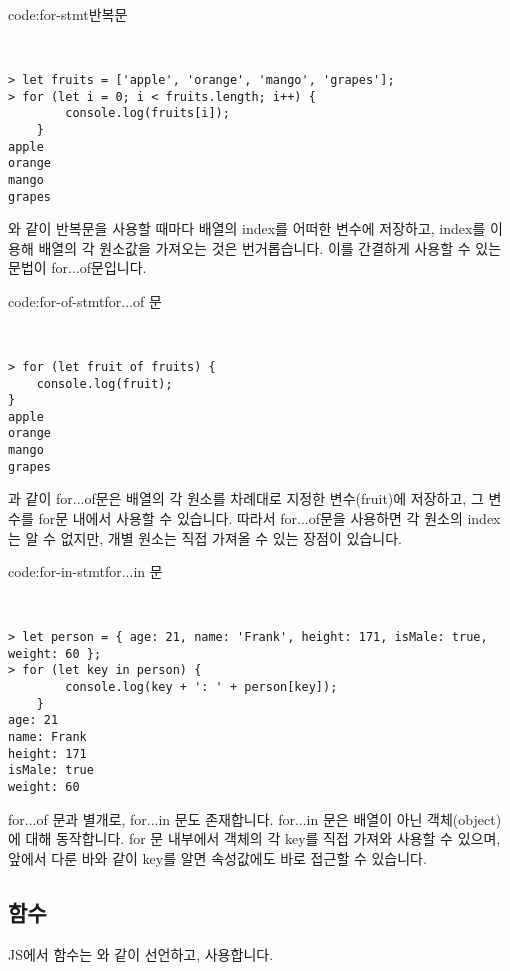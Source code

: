 \begin{codeenv}{code:for-stmt}{반복문}\begin{verbatim}


> let fruits = ['apple', 'orange', 'mango', 'grapes'];
> for (let i = 0; i < fruits.length; i++) {
        console.log(fruits[i]);
    }
apple
orange
mango
grapes
\end{verbatim}
\end{codeenv}

와 같이 반복문을 사용할 때마다 배열의 index를 어떠한 변수에 저장하고, index를 이용해 배열의 각 원소값을 가져오는 것은 번거롭습니다. 이를 간결하게 사용할 수 있는 문법이 for...of문입니다.

\begin{codeenv}{code:for-of-stmt}{for...of 문}\begin{verbatim}


> for (let fruit of fruits) {
    console.log(fruit);
}
apple
orange
mango
grapes
\end{verbatim}
\end{codeenv}

과 같이 for...of문은 배열의 각 원소를 차례대로 지정한 변수(fruit)에 저장하고, 그 변수를 for문 내에서 사용할 수 있습니다. 따라서 for...of문을 사용하면 각 원소의 index는 알 수 없지만, 개별 원소는 직접 가져올 수 있는 장점이 있습니다.

\begin{codeenv}{code:for-in-stmt}{for...in 문}\begin{verbatim}


> let person = { age: 21, name: 'Frank', height: 171, isMale: true, weight: 60 };
> for (let key in person) {
        console.log(key + ': ' + person[key]);
    }
age: 21
name: Frank
height: 171
isMale: true
weight: 60
\end{verbatim}
\end{codeenv}

for...of 문과 별개로, for...in 문도 존재합니다. for...in 문은 배열이 아닌 객체(object)에 대해 동작합니다. for 문 내부에서 객체의 각 key를 직접 가져와 사용할 수 있으며, 앞에서 다룬 바와 같이 key를 알면 속성값에도 바로 접근할 수 있습니다.

\subsection*{함수}

JS에서 함수는 와 같이 선언하고, 사용합니다. 

